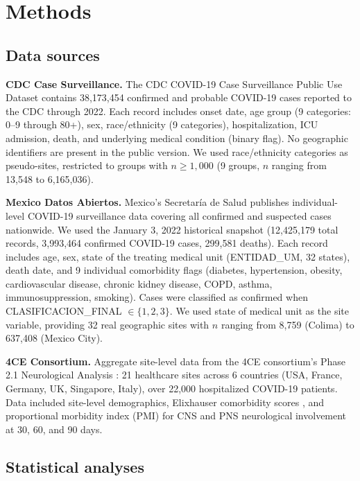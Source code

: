 \documentclass{article}
\begin{document}
\section{Methods}

\subsection{Data sources}

\textbf{CDC Case Surveillance.}  The CDC COVID-19 Case Surveillance Public
Use Dataset contains 38,173,454 confirmed and probable COVID-19 cases reported
to the CDC through 2022.  Each record includes onset date, age group (9
categories: 0--9 through 80+), sex, race/ethnicity (9 categories),
hospitalization, ICU admission, death, and underlying medical condition (binary
flag).  No geographic identifiers are present in the public version.  We used
race/ethnicity categories as pseudo-sites, restricted to groups with $n \geq
1{,}000$ (9 groups, $n$ ranging from 13,548 to 6,165,036).

\textbf{Mexico Datos Abiertos.}  Mexico's Secretar\'{i}a de Salud publishes
individual-level COVID-19 surveillance data covering all confirmed and
suspected cases nationwide.  We used the January 3, 2022 historical snapshot
(12,425,179 total records, 3,993,464 confirmed COVID-19 cases, 299,581
deaths).  Each record includes age, sex, state of the treating medical unit
(ENTIDAD\_UM, 32 states), death date, and 9 individual comorbidity flags
(diabetes, hypertension, obesity, cardiovascular disease, chronic kidney
disease, COPD, asthma, immunosuppression, smoking).  Cases were classified as
confirmed when CLASIFICACION\_FINAL $\in \{1, 2, 3\}$.  We used state of
medical unit as the site variable, providing 32 real geographic sites with
$n$ ranging from 8,759 (Colima) to 637,408 (Mexico City).

\textbf{4CE Consortium.}  Aggregate site-level data from the 4CE consortium's
Phase 2.1 Neurological Analysis \cite{four_ce_neuro2021}: 21 healthcare sites
across 6 countries (USA, France, Germany, UK, Singapore, Italy), over 22,000
hospitalized COVID-19 patients.  Data included site-level demographics,
Elixhauser comorbidity scores \cite{elixhauser1998}, and proportional morbidity
index (PMI) for CNS and PNS neurological involvement at 30, 60, and 90 days.

\subsection{Statistical analyses}
\end{document}
